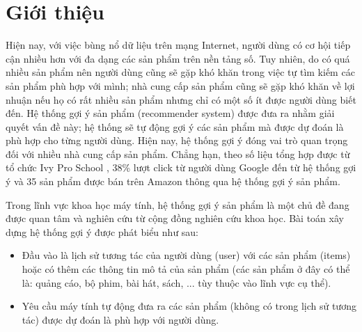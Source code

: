 \chapter{Giới thiệu}
\label{Chapter1}
\graphicspath{{Chapter1/Chapter1Figs}}
\justifying

\setlength{\parindent}{6.5ex}





Hiện nay, với việc bùng nổ dữ liệu trên mạng Internet, người dùng có cơ hội tiếp cận nhiều hơn với đa dạng các sản phẩm trên nền tảng số. Tuy nhiên, do có quá nhiều sản phẩm nên người dùng cũng sẽ gặp khó khăn trong việc tự tìm kiếm các sản phẩm phù hợp với mình; nhà cung cấp sản phẩm cũng sẽ gặp khó khăn về lợi nhuận nếu họ có rất nhiều sản phẩm nhưng chỉ có một số ít được người dùng biết đến.
Hệ thống gợi ý sản phẩm (recommender system) được đưa ra nhằm giải quyết vấn đề này; hệ thống sẽ tự động gợi ý các sản phẩm mà được dự đoán là phù hợp cho từng người dùng. Hiện nay, hệ thống gợi ý đóng vai trò quan trọng đối với nhiều nhà cung cấp sản phẩm. Chẳng hạn, theo số liệu tổng hợp được từ tổ chức Ivy Pro School \cite{ivy}, 38\% lượt click từ người dùng Google đến từ hệ thống gợi ý và 35 sản phẩm được bán trên Amazon thông qua hệ thống gợi ý sản phẩm.

Trong lĩnh vực khoa học máy tính, hệ thống gợi ý sản phẩm là một chủ đề 
đang được quan tâm và nghiên cứu từ cộng đồng nghiên cứu khoa học.
Bài toán xây dựng hệ thống gợi ý được phát biểu như sau:
\begin{itemize}
    \item Đầu vào là lịch sử tương tác của người dùng (user) với các sản phẩm (items) hoặc có thêm các thông tin mô tả của sản phẩm 
    (các sản phẩm ở đây có thể là: quảng cáo, bộ phim, bài hát, sách, ... tùy thuộc vào lĩnh vực cụ thể).
    \item Yêu cầu máy tính tự động đưa ra các sản phẩm (không có trong lịch sử tương tác) được dự đoán là phù hợp với người dùng.
\end{itemize}

